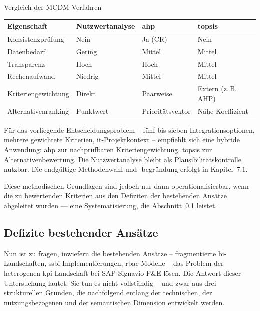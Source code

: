 \begin{batable}[label=tab:mcdm-vergleich]{Vergleich der MCDM-Verfahren}
\small\setlength{\tabcolsep}{10pt}\renewcommand{\arraystretch}{1.4}
\begin{tabular}{|p{3.6cm}|p{2.9cm}|p{2.9cm}|p{2.9cm}|}
\hline
\textbf{Eigenschaft} & \textbf{Nutz\-wert\-ana\-lyse} & \textbf{\gls{ahp}} & \textbf{\gls{topsis}} \\
\hline
Konsistenzprüfung & Nein & Ja (CR) & Nein \\
\hline
Datenbedarf & Gering & Mittel & Mittel \\
\hline
Transparenz & Hoch & Hoch & Mittel \\
\hline
Rechenaufwand & Niedrig & Mittel & Mittel \\
\hline
Kriteriengewichtung & Direkt & Paarweise & Extern (z.\,B. AHP) \\
\hline
Alternativenranking & Punktwert & Prioritätsvektor & Nähe-Koeffizient \\
\hline
\end{tabular}
\end{batable}

Für das vorliegende Entscheidungsproblem -- fünf bis sieben Integrationsoptionen, mehrere gewichtete Kriterien, \gls{it}-Projektkontext -- empfiehlt sich eine hybride Anwendung: \gls{ahp} zur nachprüfbaren Kriteriengewichtung, \gls{topsis} zur Alternativenbewertung.
Die Nutzwertanalyse bleibt als Plausibilitätskontrolle nutzbar.
Die endgültige Methodenwahl und -begründung erfolgt in Kapitel~7.1.

Diese methodischen Grundlagen sind jedoch nur dann operationalisierbar, wenn die zu bewertenden Kriterien aus den Defiziten der bestehenden Ansätze abgeleitet wurden — eine Systematisierung, die Abschnitt~\ref{sec:grundlagen-defizite} leistet.


\subsection{Defizite bestehender Ansätze}
\label{sec:grundlagen-defizite}

Nun ist zu fragen, inwiefern die bestehenden Ansätze -- fragmentierte \gls{bi}-Land\-schaften, \gls{ssbi}-Imple\-men\-tierungen, \gls{rbac}-Modelle -- das Problem der heterogenen \gls{kpi}-Landschaft bei SAP Signavio P\&E lösen.
Die Antwort dieser Untersuchung lautet: Sie tun es nicht vollständig -- und zwar aus drei strukturellen Gründen, die nachfolgend entlang der technischen, der nutzungsbezogenen und der semantischen Dimension entwickelt werden.

